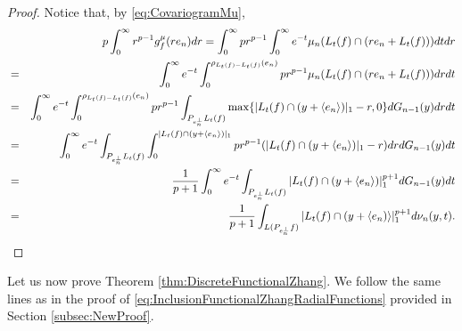 \documentclass{amsart}
\theoremstyle{remark}
\theoremstyle{definition}
\numberwithin{equation}{section}
\begin{document}
\begin{proof}
Notice that, by \eqref{eq:CovariogramMu},
\begin{eqnarray*}
&&p\int_0^{\infty} r^{p-1} g_f^\mu(re_n) dr=\int_0^{\infty} p r^{p-1} \int_0^{\infty} e^{-t} \mu_n(L_t(f) \cap (re_n+L_t(f))) dt dr \cr
&=& \int_0^{\infty} e^{-t} \int_0^{\rho_{L_t(f)-L_t(f)}(e_n)} p r^{p-1}  \mu_n(L_t(f) \cap (re_n+L_t(f))) dr dt \cr
&=& \int_0^{\infty} e^{-t} \int_0^{\rho_{L_t(f)-L_t(f)}(e_n)} p r^{p-1}  \int_{P_{e_n^{\perp}}L_t(f)} \max \{|L_t(f) \cap (y+\langle e_n \rangle) |_1 - r , 0  \} dG_{n-1}(y) dr dt \cr
&=&  \int_0^{\infty} e^{-t} \int_{P_{e_n^{\perp}}L_t(f)} \int_0^{ |L_t(f) \cap (y+\langle e_n \rangle) |_1  } p r^{p-1}  ( |L_t(f) \cap (y+\langle e_n \rangle) |_1 - r ) dr dG_{n-1}(y) dt \cr
&=&\frac{1}{p+1}\int_0^{\infty} e^{-t} \int_{P_{e_n^{\perp}}L_t(f)}  |L_t(f) \cap (y+\langle e_n \rangle) |_1^{p+1} dG_{n-1}(y) dt\cr
&=&\frac{1}{p+1}\int_{L(P_{e_n^\perp}f)}|L_t(f)\cap(y+\langle e_n)\rangle|_1^{p+1}d\nu_{n}(y,t).
\end{eqnarray*}
\end{proof}

Let us now prove Theorem \ref{thm:DiscreteFunctionalZhang}. We follow the same lines as in the proof of \eqref{eq:InclusionFunctionalZhangRadialFunctions} provided in Section \ref{subsec:NewProof}.
\end{document}

